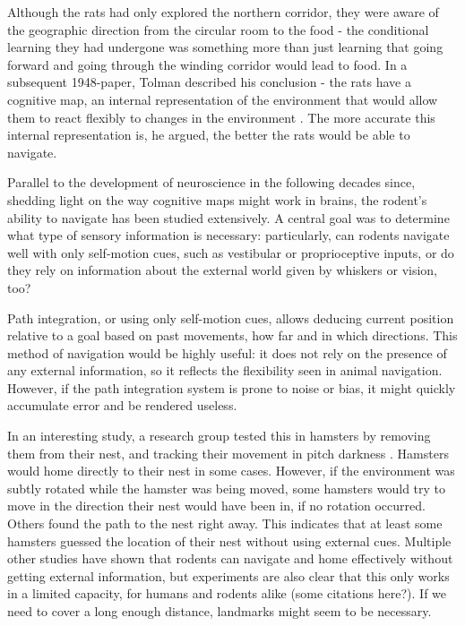 \documentclass{article}
\begin{document}
    Although the rats had only explored the northern corridor, they were aware of the geographic direction from the circular room to the food - the conditional learning they had undergone was something more than just learning that going forward and going through the winding corridor would lead to food. In a subsequent 1948-paper, Tolman described his conclusion - the rats have a cognitive map, an internal representation of the environment that would allow them to react flexibly to changes in the environment \parencite{Tolman1948}. The more accurate this internal representation is, he argued, the better the rats would be able to navigate.

    Parallel to the development of neuroscience in the following decades since, shedding light on the way cognitive maps might work in brains, the rodent's ability to navigate has been studied extensively. A central goal was to determine what type of sensory information is necessary: particularly, can rodents navigate well with only self-motion cues, such as vestibular or proprioceptive inputs, or do they rely on information about the external world given by whiskers or vision, too?

    Path integration, or using only self-motion cues, allows deducing current position relative to a goal based on past movements, how far and in which directions. This method of navigation would be highly useful: it does not rely on the presence of any external information, so it reflects the flexibility seen in animal navigation. However, if the path integration system is prone to noise or bias, it might quickly accumulate error and be rendered useless.

    In an interesting study, a research group tested this in hamsters by removing them from their nest, and tracking their movement in pitch darkness \parencite{Etienne1980}. Hamsters would home directly to their nest in some cases. However, if the environment was subtly rotated while the hamster was being moved, some hamsters would try to move in the direction their nest would have been in, if no rotation occurred. Others found the path to the nest right away. This indicates that at least some hamsters guessed the location of their nest without using external cues. Multiple other studies have shown that rodents can navigate and home effectively without getting external information, but experiments are also clear that this only works in a limited capacity, for humans and rodents alike (some citations here?). If we need to cover a long enough distance, landmarks might seem to be necessary.
\end{document}
